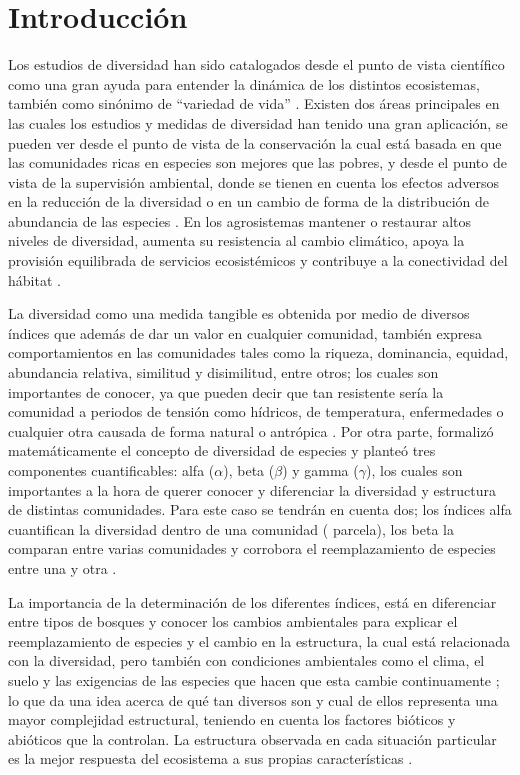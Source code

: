 \documentclass[conference,final,12pt,]{IEEEtran}
\begin{document}
\hypertarget{introducciuxf3n}{%
\section{Introducción}\label{introducciuxf3n}}

Los estudios de diversidad han sido catalogados desde el punto de vista
científico como una gran ayuda para entender la dinámica de los
distintos ecosistemas, también como sinónimo de ``variedad de vida''
\citep{A}. Existen dos áreas principales en las cuales los estudios y
medidas de diversidad han tenido una gran aplicación, se pueden ver
desde el punto de vista de la conservación la cual está basada
en que las comunidades ricas en especies son mejores que las pobres, y
desde el punto de vista de la supervisión ambiental, donde se tienen en
cuenta los efectos adversos en la reducción de la diversidad o en un
cambio de forma de la distribución de abundancia de las especies
\citep{B}. En los agrosistemas mantener o restaurar altos niveles de
diversidad, aumenta su resistencia al cambio climático, apoya la
provisión equilibrada de servicios ecosistémicos y contribuye a la
conectividad del hábitat \citep{C}.

La diversidad como una medida tangible es obtenida por medio de diversos
índices que además de dar un valor en cualquier comunidad, también
expresa comportamientos en las comunidades tales como la riqueza,
dominancia, equidad, abundancia relativa, similitud y disimilitud, entre
otros; los cuales son importantes de conocer, ya que pueden decir que
tan resistente sería la comunidad a periodos de tensión como
hídricos, de temperatura, enfermedades o cualquier otra causada de forma
natural o antrópica \citep{D}. Por otra parte, \citep{E} formalizó
matemáticamente el concepto de diversidad de especies y planteó tres
componentes cuantificables: alfa (\(\alpha\)), beta (\(\beta\)) y gamma
(\(\gamma\)), los cuales son importantes a la hora de querer conocer y
diferenciar la diversidad y estructura de distintas comunidades. Para este 
caso se tendrán en cuenta dos; los índices alfa cuantifican la diversidad dentro de una comunidad ( parcela), los beta la comparan entre varias comunidades y corrobora el reemplazamiento de especies entre una y otra \citep{G}.

La importancia de la determinación de los diferentes índices, está en
diferenciar entre tipos de bosques y conocer los cambios ambientales
para explicar el reemplazamiento de especies y el cambio en la
estructura, la cual está relacionada con la diversidad, pero también con
condiciones ambientales como el clima, el suelo\citep{H} y las exigencias
de las especies \citep{J} que hacen que esta cambie continuamente
\citep{I}; lo que da una idea acerca de qué tan diversos son y cual de
ellos representa una mayor complejidad estructural, teniendo en cuenta
los factores bióticos y abióticos que la controlan. La
estructura observada en cada situación particular es la mejor respuesta
del ecosistema a sus propias características \citep{F}.
\end{document}
